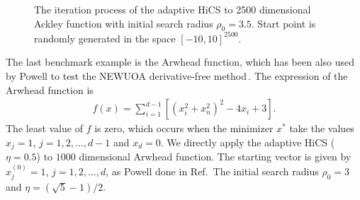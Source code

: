 \documentclass[mathpazo]{csam}
\theoremstyle{remark}
\begin{document}
\begin{figure}[!htbp]
	  \caption{The iteration process of the adaptive HiCS to 2500
	  dimensional Ackley function with initial search
	  radius $\rho_0=3.5$. Start point is randomly generated in the
	  space $[-10, 10]^{2500}$. } 
	\label{fig:ackley2500D:AHiCS}
\end{figure}

The last benchmark example is the Arwhead function, which has been
also used by Powell to test the NEWUOA derivative-free
method\,\cite{powell2006newuoa}. The expression of the Arwhead function is
\begin{align}
	f(x) = \sum_{i=1}^{d-1}[(x_i^2+x_n^2)^2 - 4 x_i +3].
	\label{}
\end{align}
The least value of $f$ is zero, which occurs when the minimizer
$x^*$ take the values $x_j=1$, $j=1,2,\dots,d-1$ and $x_d=0$. 
We directly apply the adaptive HiCS ($\eta=0.5$) to $1000$
dimensional Arwhead function.
The starting vector is given by $x_j^{(0)}=1$, $j=1,2,\dots,d$, as
Powell done in Ref.\,\cite{powell2006newuoa}
The initial search radius $\rho_0=3$ and $\eta=(\sqrt{5}-1)/2$.
\end{document}
